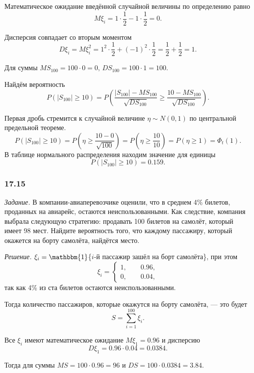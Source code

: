 Математическое ожидание введённой случайной величины по определению равно
$$M \xi_i =
  1 \cdot \frac{1}{2} - 1 \cdot \frac{1}{2} =
  0.$$

Дисперсия совпадает со вторым моментом
$$D \xi_i =
  M \xi_i^2 =
  1^2 \cdot \frac{1}{2} + \left( -1 \right)^2 \cdot \frac{1}{2} =
  \frac{1}{2} + \frac{1}{2} =
  1.$$

Для суммы $MS_{100} = 100 \cdot 0 = 0, \, DS_{100} = 100 \cdot 1 = 100$.

Найдём вероятность
$$P \left( \left| S_{100} \right| \geq 10 \right) =
  P \left(
    \frac{ \left| S_{100} \right| - MS_{100}}{ \sqrt{DS_{100}}} \geq
    \frac{10 - MS_{100}}{ \sqrt{DS_{100}}}
  \right).$$

Первая дробь стремится к случайной величине $ \eta \sim N \left( 0, 1 \right) $
по центральной предельной теореме.
$$P \left( \left| S_{100} \right| \geq 10 \right) =
  P \left( \eta \geq \frac{10 - 0}{ \sqrt{100}} \right) =
  P \left( \eta \geq \frac{10}{10} \right) =
  P \left( \eta \geq 1 \right) =
  \Phi_t \left( 1 \right).$$
В таблице нормального распределения находим значение для единицы
$$P \left( \left| S_{100} \right| \geq 10 \right) =
  0.159.$$

\subsubsection*{17.15}

\textit{Задание.}
В компании-авиаперевозчике оценили, что в среднем 4\% билетов, проданных на авиарейс,
остаются неиспользованными.
Как следствие, компания выбрала следующую стратегию: продавать 100 билетов на самолёт,
который имеет 98 мест.
Найдите вероятность того, что каждому пассажиру, который окажется на борту самолёта, найдётся место.

\textit{Решение.} $ \xi_i = \mathbbm{1}$\{$i$-й пассажир зашёл на борт самолёта\}, при этом
$$ \xi_i =
  \begin{cases}
    1, \qquad 0.96, \\
    0, \qquad 0.04,
  \end{cases}$$
так как 4\% из ста билетов остаются неиспользованными.

Тогда количество пассажиров, которые окажутся на борту самолёта, --- это будет
$$S =
  \sum \limits_{i = 1}^{100} \xi_i.$$

Все $ \xi_i$ имеют математическое ожидание $M \xi_1 = 0.96$ и дисперсию
$$D \xi_1 =
  0.96 \cdot 0.04 =
  0.0384.$$

Тогда для суммы $MS = 100 \cdot 0.96 = 96$ и $DS = 100 \cdot 0.0384 = 3.84$.

